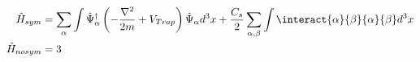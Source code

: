 \begin{eqnarray}
\hat{H}_{sym} & = \sum_{\alpha} \int \afc{\alpha} \left( -\frac{\nabla^2}{2m} + V_{Trap} \right) \afa{\alpha} d^3x + \frac{C_s}{2}\sum_{\alpha,\beta}\int \interact{\alpha}{\beta}{\alpha}{\beta} d^3x \\
\hat{H}_{nosym} & = 3
\end{eqnarray}






